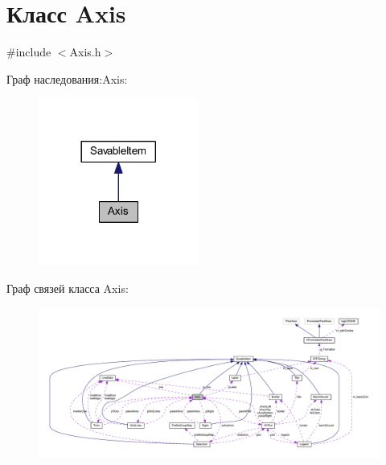 \hypertarget{class_axis}{\section{Класс Axis}
\label{class_axis}
}


{\ttfamily \#include $<$Axis.\-h$>$}



Граф наследования\-:Axis\-:
\nopagebreak
\begin{figure}[H]
\begin{center}
\leavevmode
\includegraphics[width=149pt]{class_axis__inherit__graph}
\end{center}
\end{figure}


Граф связей класса Axis\-:
\nopagebreak
\begin{figure}[H]
\begin{center}
\leavevmode
\includegraphics[width=350pt]{class_axis__coll__graph}
\end{center}
\end{figure}
